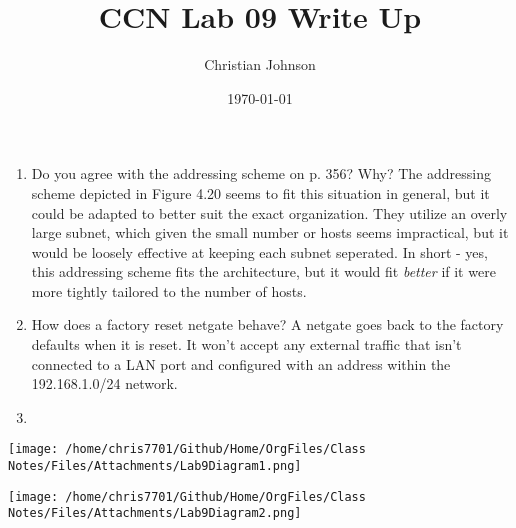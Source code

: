 \documentclass[11pt]{article}
\author{Christian Johnson}
\date{\today}
\title{CCN Lab 09 Write Up}
\begin{document}
\maketitle
\tableofcontents

\begin{enumerate}
\item Do you agree with the addressing scheme on p. 356? Why?
The addressing scheme depicted in Figure 4.20 seems to fit this situation in general, but it could be adapted to better suit the exact organization. They utilize an overly large subnet, which given the small number or hosts seems impractical, but it would be loosely effective at keeping each subnet seperated. In short - yes, this addressing scheme fits the architecture, but it would fit \emph{better} if it were more tightly tailored to the number of hosts.
\item How does a factory reset netgate behave?
A netgate goes back to the factory defaults when it is reset. It won't accept any external traffic that isn't connected to a LAN port and configured with an address within the 192.168.1.0/24 network.
\item 
\end{enumerate}
\begin{figure*}
\centering
\texttt{[image: /home/chris7701/Github/Home/OrgFiles/Class Notes/Files/Attachments/Lab9Diagram1.png]}
\end{figure*}

\begin{figure*}
\centering
\texttt{[image: /home/chris7701/Github/Home/OrgFiles/Class Notes/Files/Attachments/Lab9Diagram2.png]}
\end{figure*}
\end{document}
